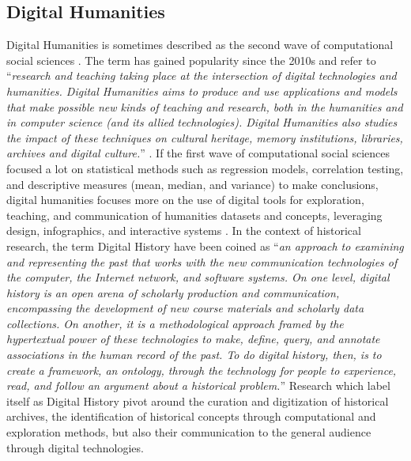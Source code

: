 


\subsection{Digital Humanities}\label{subsec:DH}

Digital Humanities is sometimes described as the second wave of computational social sciences \cite{lemercierQuantitativeMethodsHumanities2019}.
The term has gained popularity since the 2010s and refer to ``\textit{research and teaching taking place at the intersection of digital technologies and humanities. Digital Humanities aims to produce and use applications and models that make possible new kinds of teaching and research, both in the humanities and
in computer science (and its allied technologies). Digital Humanities also studies the impact of these techniques on cultural heritage, memory institutions, libraries, archives and digital culture.}'' \cite{terras2011quantifying}.
If the first wave of computational social sciences focused a lot on statistical methods such as regression models, correlation testing, and descriptive measures (mean, median, and variance) to make conclusions, digital humanities focuses more on the use of digital tools for exploration, teaching, and communication of humanities datasets and concepts, leveraging design, infographics, and interactive systems \cite{burdickDigitalHumanities2016}.
In the context of historical research, the term Digital History have been coined as ``\textit{an approach to examining and representing the past that works with the new communication technologies of the computer, the Internet network, and software systems. On one level, digital history is an open arena of scholarly production and communication, encompassing the development of new course materials and scholarly data collections. On another, it is a methodological approach framed by the hypertextual power of these technologies to make, define, query, and annotate associations in the human record of the past. To do digital history, then, is to create a framework, an ontology, through the technology for people to experience, read, and follow an argument about a historical problem.}'' \cite{InterchangePromiseDigital2008}
Research which label itself as Digital History pivot around the curation and digitization of historical archives, the identification of historical concepts through computational and exploration methods, but also their communication to the general audience through digital technologies.

